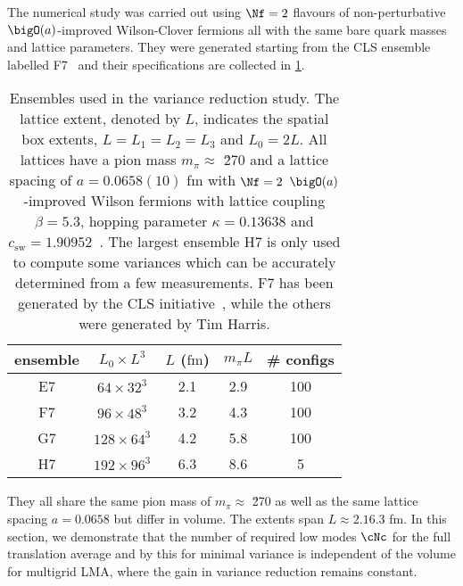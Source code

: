 The numerical study was carried out using $\Nf=2$ flavours of non-perturbative $\bigO(a)$-improved Wilson-Clover fermions all with the same bare quark masses and lattice parameters.
They were generated starting from the CLS ensemble labelled F7~\cite{online:cls} and their specifications are collected in \cref{tab:mglma:ensembles}.
\begin{table}[t]
\centering
\begin{tabular}{ccccc}
\toprule
{ensemble}&
{$L_0 \times L^3$}&
{$L$ ($\mathrm{fm}$)}&
{$m_{\pi} L$}&
{\# configs} \\
\midrule
E7 & $64  \times 32^3$ & 2.1 & 2.9 & 100 \\
F7 & $96  \times 48^3$ & 3.2 & 4.3 & 100 \\
G7 & $128 \times 64^3$ & 4.2 & 5.8 & 100 \\
H7 & $192 \times 96^3$ & 6.3 & 8.6 & 5   \\
\bottomrule
\end{tabular}
\caption{\label{tab:mglma:ensembles}%
Ensembles used in the variance reduction study.
The lattice extent, denoted by $L$, indicates the spatial box extents, $L = L_1 = L_2 = L_3$ and $L_0 = 2L$.
All lattices have a pion mass $m_{\pi} \approx $ \u{270}{\MeV} and a lattice spacing of $a = 0.0658(10)$ fm with $\Nf=2$ $\bigO(a)$-improved Wilson fermions with lattice coupling $\beta=5.3$, hopping parameter $\kappa=0.13638$ and $c_\mathrm{sw} = 1.90952$~\cite{online:cls,Jansen:1998mx}.
The largest ensemble H7 is only used to compute some variances which can be accurately determined from a few measurements.
F7 has been generated by the CLS initiative~\cite{online:cls}, while the others were generated by Tim Harris.
}
\end{table}
They all share the same pion mass of $m_{\pi} \approx $ \u{270}{\MeV} as well as the same lattice spacing $a = 0.0658$ but differ in volume.
The extents span $L \approx 2.1 6.3$ fm.
In this section, we demonstrate that the number of required low modes $\cNc$ for the full translation average and by this for minimal variance is independent of the volume for multigrid LMA, where the gain in variance reduction remains constant.

